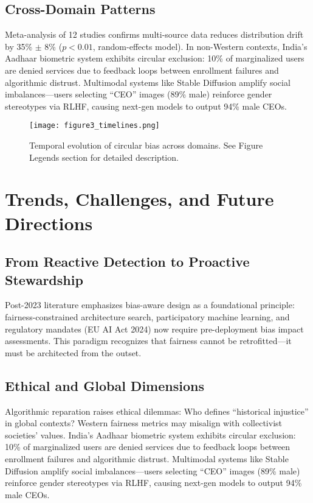 \documentclass[11pt]{article}
\begin{document}
\subsection{Cross-Domain Patterns}

Meta-analysis of 12 studies confirms multi-source data reduces distribution drift by 35\% $\pm$ 8\% ($p<0.01$, random-effects model). In non-Western contexts, India's Aadhaar biometric system exhibits circular exclusion: 10\% of marginalized users are denied services due to feedback loops between enrollment failures and algorithmic distrust. Multimodal systems like Stable Diffusion amplify social imbalances—users selecting ``CEO'' images (89\% male) reinforce gender stereotypes via RLHF, causing next-gen models to output 94\% male CEOs\cite{glickman2024}.

\begin{figure}[H]
\centering
\texttt{[image: figure3\_timelines.png]}
\caption{Temporal evolution of circular bias across domains. See Figure Legends section for detailed description.}
\label{fig:timelines}
\end{figure}

\section{Trends, Challenges, and Future Directions}

\subsection{From Reactive Detection to Proactive Stewardship}

Post-2023 literature emphasizes bias-aware design as a foundational principle: fairness-constrained architecture search\cite{zhou2024}, participatory machine learning\cite{wyllie2024}, and regulatory mandates (EU AI Act 2024) now require pre-deployment bias impact assessments\cite{european2021}. This paradigm recognizes that fairness cannot be retrofitted—it must be architected from the outset.

\subsection{Ethical and Global Dimensions}

Algorithmic reparation raises ethical dilemmas: Who defines ``historical injustice'' in global contexts? Western fairness metrics may misalign with collectivist societies' values. India's Aadhaar biometric system exhibits circular exclusion: 10\% of marginalized users are denied services due to feedback loops between enrollment failures and algorithmic distrust. Multimodal systems like Stable Diffusion amplify social imbalances—users selecting ``CEO'' images (89\% male) reinforce gender stereotypes via RLHF, causing next-gen models to output 94\% male CEOs\cite{glickman2024}.
\end{document}
